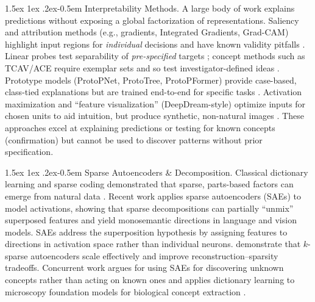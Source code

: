 \documentclass{article}
\makeatletter
\renewcommand{\paragraph}{%
  \@startsection{paragraph}{4}%
  {\z@}{1.5ex \@plus 1ex \@minus .2ex}{-0.5em}%
  {\normalfont\normalsize\bfseries}%
}
\theoremstyle{plain}
\theoremstyle{definition}
\theoremstyle{remark}
\makeatother
\begin{document}
\paragraph{Interpretability Methods.}
A large body of work explains predictions without exposing a global factorization of representations.
Saliency and attribution methods (e.g., gradients, Integrated Gradients, Grad-CAM) highlight input regions for \emph{individual} decisions and have known validity pitfalls \citep{simonyan2013deep,sundararajan2017axiomatic,selvaraju2017gradcam,adebayo2018sanity}.
Linear probes test separability of \emph{pre-specified} targets \citep{alain2016understanding,hewitt2019probes}; concept methods such as TCAV/ACE require exemplar sets and so test investigator-defined ideas \citep{kim2018tcav,ghorbani2019ace}.
Prototype models (ProtoPNet, ProtoTree, ProtoPFormer) provide case-based, class-tied explanations but are trained end-to-end for specific tasks \citep{chen2019protopnet,nauta2021prototree,xue2022protopformer}.
Activation maximization and “feature visualization” (DeepDream-style) optimize inputs for chosen units to aid intuition, but produce synthetic, non-natural images \citep{mahendran2016visualizing,nguyen2016dgn,olah2017feature}.
These approaches excel at explaining predictions or testing for known concepts (confirmation) but cannot be used to discover patterns without prior specification.

\paragraph{Sparse Autoencoders \& Decomposition.}
Classical dictionary learning and sparse coding demonstrated that sparse, parts-based factors can emerge from natural data \citep{olshausen1996nature,aharon2006ksvd,lee1999nmf}.
Recent work applies sparse autoencoders (SAEs) to model activations, showing that sparse decompositions can partially ``unmix'' superposed features and yield monosemantic directions \citep{elhage2022superposition,bricken2023monosemanticity,gao2025scaling} in language and vision models.
SAEs address the superposition hypothesis \citep{elhage2022superposition} by assigning features to directions in activation space rather than individual neurons.
\citeauthor{gao2025scaling} demonstrate that $k$-sparse autoencoders scale effectively and improve reconstruction--sparsity tradeoffs.
Concurrent work argues for using SAEs for discovering unknown concepts rather than acting on known ones \citep{peng2025unknown} and applies dictionary learning to microscopy foundation models for biological concept extraction \citep{donhauser2024towards}.
\end{document}
